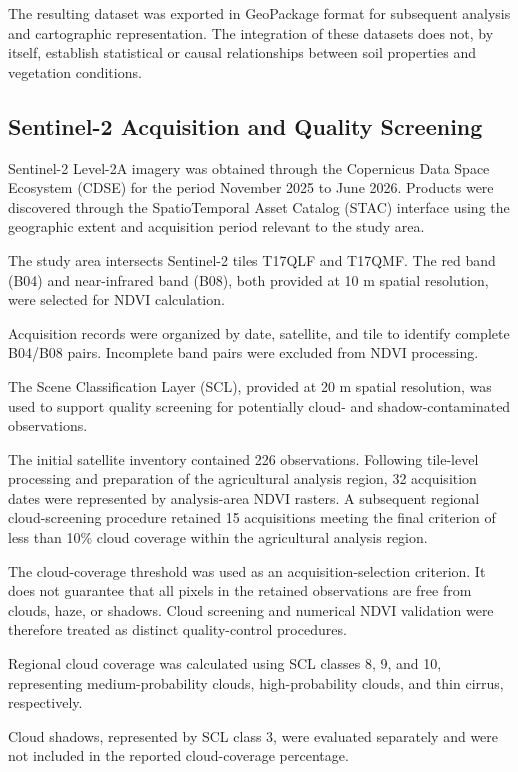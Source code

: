 The resulting dataset was exported in GeoPackage
format for subsequent analysis and cartographic
representation. The integration of these
datasets does not, by itself, establish
statistical or causal relationships between
soil properties and vegetation conditions.


\subsection{Sentinel-2 Acquisition and Quality Screening}
\label{subsec:sentinel-acquisition}

Sentinel-2 Level-2A imagery was obtained through
the Copernicus Data Space Ecosystem (CDSE) for
the period November 2025 to June 2026. Products
were discovered through the SpatioTemporal Asset
Catalog (STAC) interface using the geographic
extent and acquisition period relevant to the
study area.

The study area intersects Sentinel-2 tiles
T17QLF and T17QMF. The red band (B04) and
near-infrared band (B08), both provided at
10 m spatial resolution, were selected for
NDVI calculation.

Acquisition records were organized by date,
satellite, and tile to identify complete B04/B08
pairs. Incomplete band pairs were excluded
from NDVI processing.

The Scene Classification Layer (SCL), provided
at 20 m spatial resolution, was used to support
quality screening for potentially cloud- and
shadow-contaminated observations.

The initial satellite inventory contained
226 observations. Following tile-level processing
and preparation of the agricultural analysis
region, 32 acquisition dates were represented
by analysis-area NDVI rasters. A subsequent
regional cloud-screening procedure retained
15 acquisitions meeting the final criterion
of less than 10\% cloud coverage within the
agricultural analysis region.

The cloud-coverage threshold was used as an
acquisition-selection criterion. It does not
guarantee that all pixels in the retained
observations are free from clouds, haze, or
shadows. Cloud screening and numerical NDVI
validation were therefore treated as distinct
quality-control procedures.

Regional cloud coverage was calculated
using SCL classes 8, 9, and 10,
representing medium-probability clouds,
high-probability clouds, and thin cirrus,
respectively.

Cloud shadows, represented by SCL
class 3, were evaluated separately
and were not included in the reported
cloud-coverage percentage.

